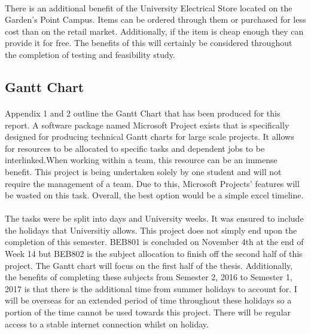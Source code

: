 \paragraph{}
There is an additional benefit of the University Electrical Store located on the Garden's Point Campus. Items can be ordered through them or purchased for less cost than on the retail market. Additionally, if the item is cheap enough they can provide it for free. The benefits of this will certainly be considered throughout the completion of testing and feasibility study.   


\subsection{Gantt Chart}

\paragraph{}
Appendix 1 and 2 outline the Gantt Chart that has been produced for this report. A software package named Microsoft Project exists that is specifically designed for producing technical Gantt charts for large scale projects. It allows for resources to be allocated to specific tasks and dependent jobs to be interlinked.When working within a team, this resource can be an immense benefit. This project is being undertaken solely by one student and will not require the management of a team. Due to this, Microsoft Projects' features will be wasted on this task. Overall, the best option would be a simple excel timeline.

\paragraph{}
The tasks were be split into days and University weeks. It was ensured to include the holidays that Universitiy allows. This project does not simply end upon the completion of this semester. BEB801 is concluded on November 4th at the end of Week 14 but BEB802 is the subject allocation to finish off the second half of this project. The Gantt chart will focus on the first half of the thesis. Additionally, the benefits of completing these subjects from Semester 2, 2016 to Semester 1, 2017 is that there is the additional time from summer holidays to account for. I will be overseas for an extended period of time throughout these holidays so a portion of the time cannot be used towards this project. There will be regular access to a stable internet connection whilst on holiday.

